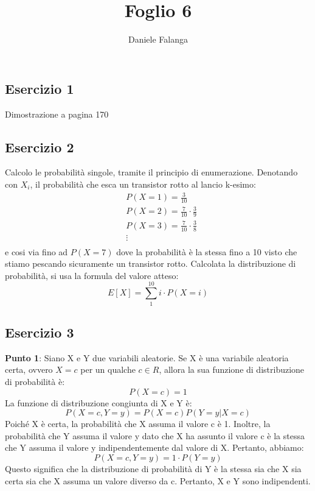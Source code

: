 \documentclass[12pt]{article}
\title{\textbf{Foglio 6}}
\author{Daniele Falanga}
\date{}
\begin{document}
\maketitle

\subsection*{Esercizio 1}
Dimostrazione a pagina 170
\subsection*{Esercizio 2}

Calcolo le probabilità singole, tramite il principio di enumerazione. Denotando con \(X_i\), 
il probabilità che esca un transistor rotto al lancio k-esimo:
\begin{align*}
    &P(X=1) = \frac{3}{10} \\
    &P(X=2) = \frac{7}{10} \cdot \frac{3}{9} \\
    &P(X=3) = \frac{7}{10} \cdot \frac{3}{8} \\
    &\vdots \\
\end{align*}
e cosi via fino ad \(P(X = 7)\) dove la probabilità è la stessa fino a 10 visto che stiamo pescando
sicuramente un transistor rotto. \newline
Calcolata la distribuzione di probabilità, si usa la formula del valore atteso: 
\[
E[X] = \sum_{1}^{10}i \cdot P(X = i)    
\]

\newpage
\subsection*{Esercizio 3}
{\bf{Punto 1}}: \newline
Siano X e Y due variabili aleatorie. Se X è una variabile aleatoria certa, 
ovvero \(X = c\) per un qualche \(c \in R\), allora la sua funzione di distribuzione di probabilità è:
\[
P(X = c) = 1  
\]
La funzione di distribuzione congiunta di X e Y è:
\[
P(X = c, Y = y) = P(X = c) P(Y = y | X = c)    
\]
Poiché X è certa, la probabilità che X assuma il valore c è 1. Inoltre, la probabilità che Y assuma 
il valore y dato che X ha assunto il valore c è la stessa che Y assuma il valore y indipendentemente dal valore di X. Pertanto, abbiamo:
\[
P(X = c, Y = y) = 1 \cdot P(Y = y)    
\]
Questo significa che la distribuzione di probabilità di Y è la stessa sia che X 
sia certa sia che X assuma un valore diverso da c. Pertanto, X e Y sono indipendenti.
\end{document}
